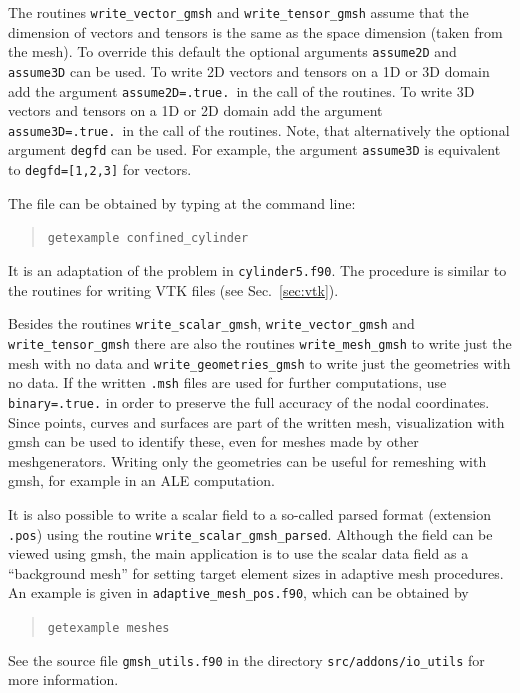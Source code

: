 The routines \texttt{write\_vector\_gmsh}
and \texttt{write\_tensor\_gmsh} assume that the dimension of vectors and tensors is the same as the space dimension (taken from the mesh). To override this default the optional arguments
\texttt{assume2D} and \texttt{assume3D} can be used.
To write 2D vectors and tensors on a 1D or 3D domain add the argument \texttt{assume2D=.true.}\ in the call of the routines.
To write 3D vectors and tensors on a 1D or 2D domain add the argument \texttt{assume3D=.true.}\ in the call of the routines. Note, that alternatively the optional argument \texttt{degfd} can be used. For example, the argument \texttt{assume3D} is equivalent to \texttt{degfd=[1,2,3]} for vectors.

The file can be obtained by typing at the
command line:
\begin{quote}
   \texttt{getexample confined\_cylinder}
\end{quote}
It is an adaptation of the problem in \texttt{cylinder5.f90}. The procedure is
similar to the routines for writing VTK files (see Sec.~\ref{sec:vtk}).

Besides the routines \texttt{write\_scalar\_gmsh},
\texttt{write\_vector\_gmsh} and
\texttt{write\_tensor\_gmsh} there are also the routines
\texttt{write\_mesh\_gmsh}
 to write just the mesh  with no data and
\texttt{write\_geometries\_gmsh}
 to write just the geometries with no data. If the written \texttt{.msh} files
are used for
further computations, use \texttt{binary=.true.} in order
 to preserve the full accuracy
of the nodal coordinates.
Since points,
curves and surfaces are part of the written mesh, visualization with
gmsh can be used to identify these,
even for meshes made by other meshgenerators.
Writing only the geometries can be useful for remeshing with gmsh,
for example in an ALE computation.

It is also possible to write a scalar field to a so-called parsed format
(extension \texttt{.pos}) using the routine
 \texttt{write\_scalar\_gmsh\_parsed}.
Although the field can be viewed using gmsh, the
main application is to use the scalar data field as a ``background mesh'' for
setting target element sizes in adaptive mesh procedures. An example is given
in \texttt{adaptive\_mesh\_pos.f90}, which can be obtained by
\begin{quote}
   \texttt{getexample meshes}
\end{quote}

See the source file \texttt{gmsh\_utils.f90} in the directory
\texttt{src/addons/io\_utils} for more information.

